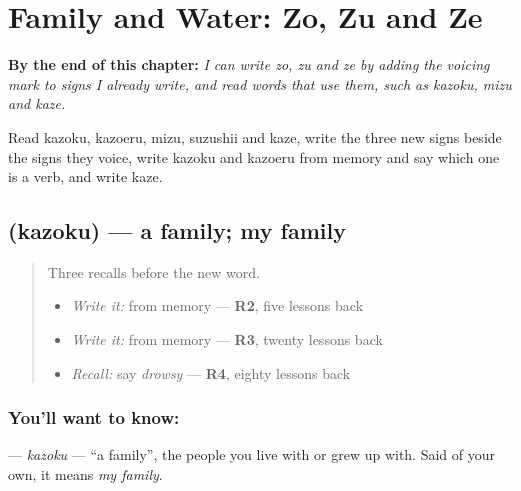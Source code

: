 
\chapter{Family and Water: Zo, Zu and Ze}
\label{ch:ja-family-and-water-zo-zu-ze}

\begin{chapteropening}
\textbf{By the end of this chapter:} \emph{I can write zo, zu and ze by adding the voicing mark to signs I already write, and read words that use them, such as kazoku, mizu and kaze.}

Read kazoku, kazoeru, mizu, suzushii and kaze, write the three new signs beside the signs they voice, write kazoku and kazoeru from memory and say which one is a verb, and write kaze.
\end{chapteropening}

\section[\texorpdfstring{\ja{かぞく} (kazoku)}{かぞく (kazoku)}]{ (kazoku) — a family; my family}

\label{lesson:JA-C136-kazoku}



\begin{quote}
Three recalls before the new word.

\begin{itemize}
\raggedright
  \item \emph{Write it:} \textbf{} from memory — \textbf{R2}, five lessons back
  \item \emph{Write it:} \textbf{} from memory — \textbf{R3}, twenty lessons back
  \item \emph{Recall:} say \emph{drowsy} — \textbf{R4}, eighty lessons back
\end{itemize}
\end{quote}

\subsection*{You'll want to know: }
\textbf{} — \emph{kazoku} — \textquotedblleft{}a family\textquotedblright{}, the people you live with or grew up with. Said of your own, it means \emph{my family}.

